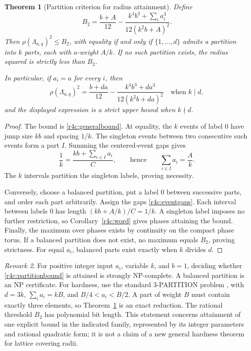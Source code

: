 \documentclass[11pt,a4paper]{article}
\newtheorem{theorem}{Theorem}[section]
\theoremstyle{definition}\newtheorem{definition}[theorem]{Definition}
\theoremstyle{remark}\newtheorem{remark}[theorem]{Remark}
\numberwithin{equation}{section}
\begin{document}
\begin{theorem}[Partition criterion for radius attainment]
\label{r4c:partition}
Define
\begin{equation}\label{r4c:partitionbound}
 B_2=\frac{b+A}{12}
       -\frac{k^4b^3+\sum_i a_i^3}{12(k^2b+A)^2}.
\end{equation}
Then $\rho(\Lambda_{a,q})^2\leq B_2$, with equality if and only if
$\{1,\ldots,d\}$ admits a partition into $k$ parts, each with
$a$-weight $A/k$.  If no such partition exists, the radius squared
is strictly less than $B_2$.

In particular, if $a_i=a$ for every $i$, then
\begin{equation}\label{r4c:equalweights}
 \rho(\Lambda_{a,q})^2
   =\frac{b+da}{12}
      -\frac{k^4b^3+da^3}{12(k^2b+da)^2}
 \quad\text{when }k\mid d,
\end{equation}
and the displayed expression is a strict upper bound when $k\nmid d$.
\end{theorem}

\begin{proof}
The bound is \eqref{r4c:generalbound}.  At equality, the $k$ events
of label $0$ have jump size $kb$ and spacing $1/k$.  The singleton
events between two consecutive such events form a part $I$.
Summing the centered-event gaps gives
\[
 \frac1k=\frac{kb+\sum_{i\in I}a_i}{C},
 \qquad\text{hence}\qquad
 \sum_{i\in I}a_i=\frac Ak.
\]
The $k$ intervals partition the singleton labels, proving necessity.

Conversely, choose a balanced partition, put a label $0$ between
successive parts, and order each part arbitrarily.  Assign the gaps
\eqref{r4c:eventgaps}.  Each interval between labels $0$ has length
$(kb+A/k)/C=1/k$.  A singleton label imposes no further restriction,
so Corollary~\ref{r4c:word} gives phases attaining the bound.
Finally, the maximum over phases exists by continuity on the compact
phase torus.  If a balanced partition does not exist, no maximum
equals $B_2$, proving strictness.  For equal $a_i$, balanced parts
exist exactly when $k$ divides $d$.
\end{proof}

\begin{remark}\label{r4c:complexity}
For positive integer input $a_i$, variable $k$, and $b=1$, deciding
whether \eqref{r4c:partitionbound} is attained is strongly
NP-complete.  A balanced partition is an NP certificate.  For
hardness, use the standard 3-PARTITION problem \cite{GJ}, with
$d=3k$, $\sum_i a_i=kB$, and $B/4<a_i<B/2$.  A part of weight $B$
must contain exactly three elements, so Theorem~\ref{r4c:partition}
is an exact reduction.  The rational threshold $B_2$ has polynomial
bit length.  This statement concerns attainment of one explicit
bound in the indicated family, represented by its integer parameters
and rational quadratic form; it is not a claim of a new general
hardness theorem for lattice covering radii.
\end{remark}
\end{document}
